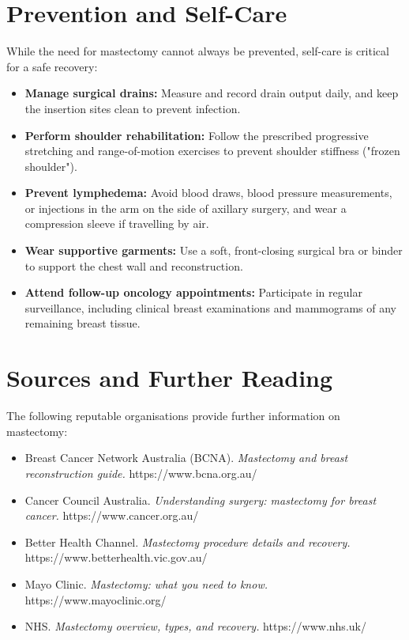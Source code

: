 \section*{Prevention and Self-Care}
While the need for mastectomy cannot always be prevented, self-care is critical for a safe recovery:
\begin{itemize}
    \item \textbf{Manage surgical drains:} Measure and record drain output daily, and keep the insertion sites clean to prevent infection.
    \item \textbf{Perform shoulder rehabilitation:} Follow the prescribed progressive stretching and range-of-motion exercises to prevent shoulder stiffness ("frozen shoulder").
    \item \textbf{Prevent lymphedema:} Avoid blood draws, blood pressure measurements, or injections in the arm on the side of axillary surgery, and wear a compression sleeve if travelling by air.
    \item \textbf{Wear supportive garments:} Use a soft, front-closing surgical bra or binder to support the chest wall and reconstruction.
    \item \textbf{Attend follow-up oncology appointments:} Participate in regular surveillance, including clinical breast examinations and mammograms of any remaining breast tissue.
\end{itemize}

\section*{Sources and Further Reading}
The following reputable organisations provide further information on mastectomy:
\begin{itemize}
    \item Breast Cancer Network Australia (BCNA). \textit{Mastectomy and breast reconstruction guide.} https://www.bcna.org.au/
    \item Cancer Council Australia. \textit{Understanding surgery: mastectomy for breast cancer.} https://www.cancer.org.au/
    \item Better Health Channel. \textit{Mastectomy procedure details and recovery.} https://www.betterhealth.vic.gov.au/
    \item Mayo Clinic. \textit{Mastectomy: what you need to know.} https://www.mayoclinic.org/
    \item NHS. \textit{Mastectomy overview, types, and recovery.} https://www.nhs.uk/
\end{itemize}
